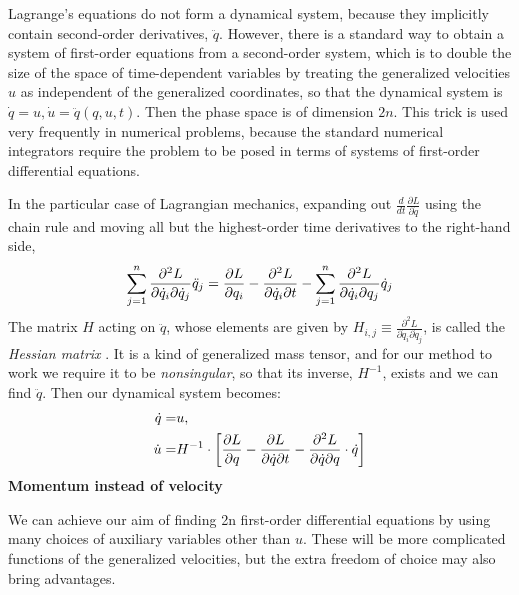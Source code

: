 \documentclass[letterpaper,10pt,english]{sphinxmanual}
\begin{document}
Lagrange’s equations do not form a dynamical system, because they implicitly contain second-order derivatives, \(\ddot{q}\). However, there is a standard way to obtain a system of first-order equations from a second-order system, which is to double the size of the space of time-dependent variables by treating the generalized velocities \(u\) as independent of the generalized coordinates, so that the dynamical system is \(\dot{q} = u, \dot{u} = \ddot{q}(q,u,t)\). Then the phase space is of dimension \(2n\). This trick is used very frequently in numerical problems, because the standard numerical integrators require the problem to be posed in terms of systems of first-order differential equations.

In the particular case of Lagrangian mechanics, expanding out \(\frac{d}{dt}\frac{\partial L}{\partial \dot{q}}\) using the chain rule and moving all but the highest-order time derivatives to the right-hand side,
\begin{gather}
\begin{split}\sum\limits_{j=1}^{n}\frac{\partial^2 L}{\partial \dot{q}_i \partial \dot{q}_j}\ddot{q}_j=\frac{\partial L}{\partial q_i}-\frac{\partial^2 L}{\partial \dot{q}_i \partial t}-\sum\limits_{j=1}^{n}\frac{\partial^2 L}{\partial \dot{q}_i \partial {q}_j}\dot{q}_j\end{split}\notag
\end{gather}
The matrix \(H\) acting on \(\ddot{q}\), whose elements are given by \(H_{i,j}\equiv\frac{\partial^2 L}{\partial \dot{q}_i \partial \dot{q}_j}\), is called the \emph{Hessian matrix} . It is a kind of generalized mass tensor, and for our method to work we require it to be \emph{nonsingular}, so that its inverse, \(H^{-1}\), exists and we can find \(\ddot{q}\). Then our dynamical system becomes:
\begin{gather}
\begin{split}\dot{q}=&u, \\
\dot{u}=&H^{-1}\cdot\left[\frac{\partial L}{\partial q}-\frac{\partial L}{\partial \dot{q}\partial t}-\frac{\partial^2 L}{\partial \dot{q}\partial q}\cdot \dot{q}\right]\end{split}\notag
\end{gather}
\textbf{Momentum instead of velocity}

We can achieve our aim of finding 2n first-order differential equations by using many choices of auxiliary variables other than \(u\). These will be more complicated functions of the generalized velocities, but the extra freedom of choice may also bring advantages.
\end{document}
